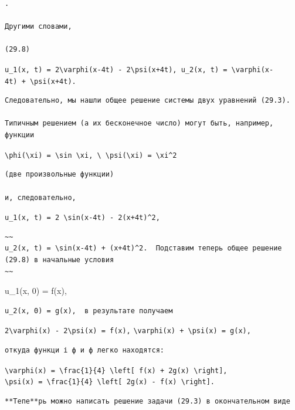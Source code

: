 \documentclass[
  ukrainian,
]{article}
\begin{document}
\begin{verbatim}
.

Другими словами,

(29.8)
\end{verbatim}

\texttt{u\_1(x,\ t)\ =\ 2\textbackslash{}varphi(x-4t)\ -\ 2\textbackslash{}psi(x+4t),\ u\_2(x,\ t)\ =\ \textbackslash{}varphi(x-4t)\ +\ \textbackslash{}psi(x+4t).}

\begin{verbatim}
Следовательно, мы нашли общее решение системы двух уравнений (29.3).

Типичным решением (а их бесконечное число) могут быть, например, функции
\end{verbatim}

\texttt{\textbackslash{}phi(\textbackslash{}xi)\ =\ \textbackslash{}sin\ \textbackslash{}xi,\ \textbackslash{}\ \textbackslash{}psi(\textbackslash{}xi)\ =\ \textbackslash{}xi\^{}2}

\begin{verbatim}
(две произвольные функции)

и, следовательно,
\end{verbatim}

\texttt{u\_1(x,\ t)\ =\ 2\ \textbackslash{}sin(x-4t)\ -\ 2(x+4t)\^{}2,}

\begin{verbatim}
~~
u_2(x, t) = \sin(x-4t) + (x+4t)^2.  Подставим теперь общее решение (29.8) в начальные условия
~~
\end{verbatim}

u\_1(x, 0) = f(x),

\begin{verbatim}
u_2(x, 0) = g(x),  в результате получаем
\end{verbatim}

\texttt{2\textbackslash{}varphi(x)\ -\ 2\textbackslash{}psi(x)\ =\ f(x),}
\texttt{\textbackslash{}varphi(x)\ +\ \textbackslash{}psi(x)\ =\ g(x),}

\begin{verbatim}
откуда функци і ф и ф легко находятся:
\end{verbatim}

\texttt{\textbackslash{}varphi(x)\ =\ \textbackslash{}frac\{1\}\{4\}\ \textbackslash{}left{[}\ f(x)\ +\ 2g(x)\ \textbackslash{}right{]},}
\texttt{\textbackslash{}psi(x)\ =\ \textbackslash{}frac\{1\}\{4\}\ \textbackslash{}left{[}\ 2g(x)\ -\ f(x)\ \textbackslash{}right{]}.}

\begin{verbatim}
**Тепе**рь можно написать решение задачи (29.3) в окончательном виде
\end{verbatim}
\end{document}
